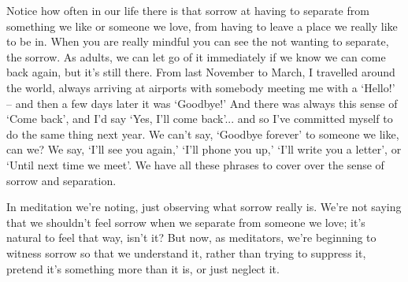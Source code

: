 Notice how often in our life there is that sorrow at having to separate from something we like or someone we love, from having to leave a place we really like to be in. When you are really mindful you can see the not wanting to separate, the sorrow. As adults, we can let go of it immediately if we know we can come back again, but it's still there. From last November to March, I travelled around the world, always arriving at airports with somebody meeting me with a `Hello!' -- and then a few days later it was `Goodbye!' And there was always this sense of `Come back', and I'd say `Yes, I'll come back'... and so I've committed myself to do the same thing next year. We can't say, `Goodbye forever' to someone we like, can we? We say, `I'll see you again,' `I'll phone you up,' `I'll write you a letter', or `Until next time we meet'. We have all these phrases to cover over the sense of sorrow and separation.

In meditation we're noting, just observing what sorrow really is. We're not saying that we shouldn't feel sorrow when we separate from someone we love; it's natural to feel that way, isn't it? But now, as meditators, we're beginning to witness sorrow so that we understand it, rather than trying to suppress it, pretend it's something more than it is, or just neglect it.

